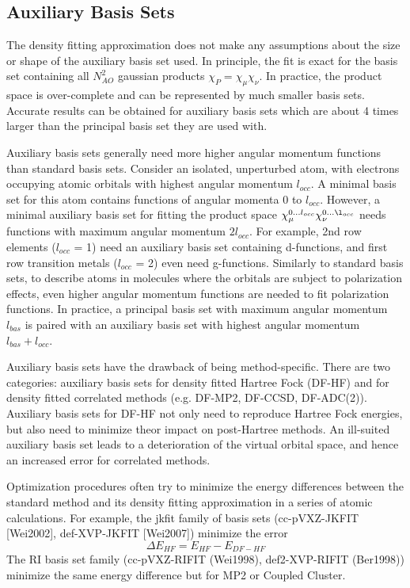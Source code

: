 \subsection{Auxiliary Basis Sets}

The density fitting approximation does not make any assumptions about the size or shape of the auxiliary basis set used. In principle, the fit is exact for the basis set containing all $N_{AO}^2$ gaussian products $\chi_P = \chi_{\mu} \chi_{\nu}$. In practice, the product space is over-complete and can be represented by much smaller basis sets. Accurate results can be obtained for auxiliary basis sets which are about 4 times larger than the principal basis set they are used with. 

Auxiliary basis sets generally need more higher angular momentum functions than standard basis sets. Consider an isolated, unperturbed atom, with electrons occupying atomic orbitals with highest angular momentum $l_{occ}$. A minimal basis set for this atom contains functions of angular momenta 0 to $l_{occ}$. However, a minimal auxiliary basis set for fitting the product space $\chi_{\mu}^{0...l_{occ}} \chi_{\nu}^{0...\l_{occ}}$ needs functions with maximum angular momentum $2l_{occ}$. For example, 2nd row elements ($l_{occ}$ = 1) need an auxiliary basis set containing d-functions, and first row transition metals ($l_{occ}$ = 2) even need g-functions. Similarly to standard basis sets, to describe atoms in molecules where the orbitals are subject to polarization effects, even higher angular momentum functions are needed to fit polarization functions. In practice, a principal basis set with maximum angular momentum $l_{bas}$ is paired with an auxiliary basis set with highest angular momentum $l_{bas} + l_{occ}$. 

Auxiliary basis sets have the drawback of being method-specific. There are two categories: auxiliary basis sets for density fitted Hartree Fock (DF-HF) and for density fitted correlated methods (e.g. DF-MP2, DF-CCSD, DF-ADC(2)). Auxiliary basis sets for DF-HF not only need to reproduce Hartree Fock energies, but also need to minimize theor impact on post-Hartree methods. An ill-suited auxiliary basis set leads to a deterioration of the virtual orbital space, and hence an increased error for correlated methods. 

Optimization procedures often try to minimize the energy differences between the standard method and its density fitting approximation in a series of atomic calculations. For example, the jkfit family of basis sets (cc-pVXZ-JKFIT [Wei2002], def-XVP-JKFIT [Wei2007]) minimize the error
\begin{equation}
\Delta E_{HF} = E_{HF} - E_{DF-HF}
\end{equation}
The RI basis set family (cc-pVXZ-RIFIT (Wei1998), def2-XVP-RIFIT (Ber1998)) minimize the same energy difference but for MP2 or Coupled Cluster. 

